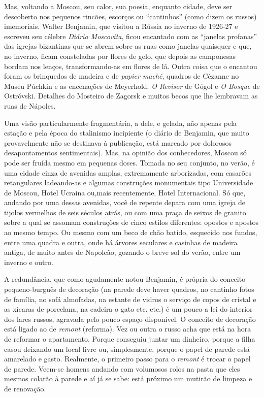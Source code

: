 Mas, voltando a Moscou, seu calor, sua poesia, enquanto cidade, deve ser
descoberto nos pequenos rincões, escorços ou ``cantinhos'' (como dizem
os russos) imemoriais. Walter Benjamin, que visitou a Rússia no inverno
de 1926-27 e escreveu seu célebre \emph{Diário Moscovita}, ficou
encantado com as ``janelas profanas'' das igrejas bizantinas que se
abrem sobre as ruas como janelas quaisquer e que, no inverno, ficam
consteladas por flores de gelo, que depois as camponesas bordam nos
lenços, transformando-as em flores de lã. Outra coisa que o encantou
foram os brinquedos de madeira e de \emph{papier maché}, quadros de
Cézanne no Museu Púchkin e as encenações de Meyerhold: \emph{O Revisor}
de Gógol e \emph{O Bosque} de Ostróvski. Detalhes do Mosteiro de Zagorsk
e muitos becos que lhe lembravam as ruas de Nápoles.

Uma visão particularmente fragmentária, a dele, e gelada, não apenas
pela estação e pela época do stalinismo incipiente (o diário de
Benjamin, que muito provavelmente não se destinava à publicação, está
marcado por dolorosos desapontamentos sentimentais). Mas, na opinião dos
conhecedores, Moscou só pode ser fruída mesmo em pequenas doses. Tomada
no seu conjunto, no verão, é uma cidade cinza de avenidas amplas,
extremamente arborizadas, com casarões retangulares ladeando-as e
algumas construções monumentais tipo Universidade de Moscou, Hotel
Ucraina ou,mais recentemente, Hotel Internacional. Só que, andando por
uma dessas avenidas, você de repente depara com uma igreja de tijolos
vermelhos de seis séculos atrás, ou com uma praça de seixos de granito
sobre a qual se assomam construções de cinco estilos diferentes: opostos
e apostos ao mesmo tempo. Ou mesmo com um beco de chão batido, esquecido
nos fundos, entre uma quadra e outra, onde há árvores seculares e
casinhas de madeira antiga, de muito antes de Napoleão, gozando o breve
sol do verão, entre um inverno e outro.

A redundância, que como agudamente notou Benjamin, é própria do conceito
pequeno-burguês de decoração (na parede deve haver quadros, no cantinho
fotos de família, no sofá almofadas, na estante de vidros o serviço de
copos de cristal e as xícaras de porcelana, na cadeira o gato etc. etc.)
é um pouco a lei do interior dos lares russos, agravada pelo pouco
espaço disponível. O conceito de decoração está ligado ao de
\emph{remont} (reforma). Vez ou outra o russo acha que está na hora de
reformar o apartamento. Porque conseguiu juntar um dinheiro, porque a
filha casou deixando um local livre ou, simplesmente, porque o papel de
parede está amarelado e gasto. Realmente, o primeiro passo para o
\emph{remont} é trocar o papel de parede. Veem-se homens andando com
volumosos rolos na pasta que eles mesmos colarão à parede e aí já se
sabe: está próximo um mutirão de limpeza e de renovação.

